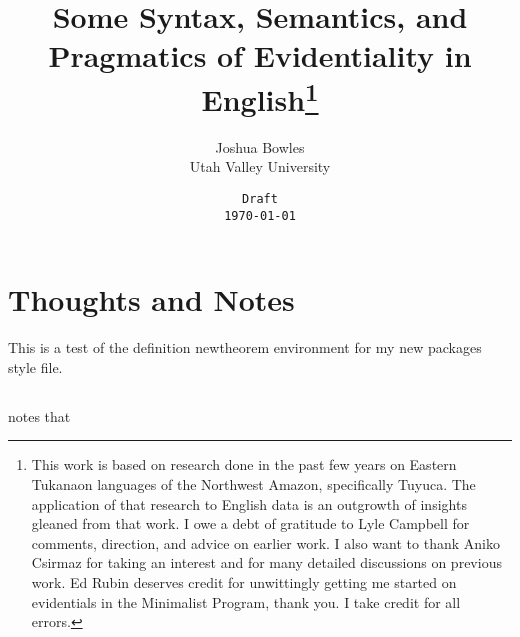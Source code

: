 \documentclass{article}
\begin{document}
\title{Some Syntax, Semantics, and Pragmatics of Evidentiality in English\footnote{This work is based on research done in the past few years on Eastern Tukanaon languages of the Northwest Amazon, specifically Tuyuca. The application of that research to English data is an outgrowth of insights gleaned from that work. I owe a debt of gratitude to Lyle Campbell for comments, direction, and advice on earlier work. I also want to thank Aniko Csirmaz for taking an interest and for many detailed discussions on previous work. Ed Rubin deserves credit for unwittingly getting me started on evidentials in the Minimalist Program, thank you. I take credit for all errors.}}

\author{Joshua Bowles\\
Utah Valley University}
\date{{\tt Draft\\ \today}}
\maketitle
\tableofcontents


\section{Thoughts and Notes}

\begin{definition}
This is a test of the definition newtheorem environment for my new packages style file.
\end{definition}  

 
\subsection{\cite{traugott89epistemic}}
 notes that 
\end{document}
